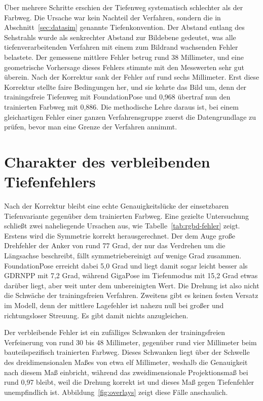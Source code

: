 \documentclass[oneside,studentpaper]{wbk}
\begin{document}
Über mehrere Schritte erschien der Tiefenweg systematisch schlechter als der
Farbweg. Die Ursache war kein Nachteil der Verfahren, sondern die in
Abschnitt~\ref{sec:datasim} genannte Tiefenkonvention. Der Abstand entlang des
Sehstrahls wurde als senkrechter Abstand zur Bildebene gedeutet, was alle
tiefenverarbeitenden Verfahren mit einem zum Bildrand wachsenden Fehler belastete.
Der gemessene mittlere Fehler betrug rund 38 Millimeter, und eine geometrische
Vorhersage dieses Fehlers stimmte mit den Messwerten sehr gut überein. Nach der
Korrektur sank der Fehler auf rund sechs Millimeter. Erst diese Korrektur stellte
faire Bedingungen her, und sie kehrte das Bild um, denn der trainingsfreie
Tiefenweg mit FoundationPose und 0,968 übertraf nun den trainierten Farbweg mit
0,886. Die methodische Lehre daraus ist, bei einem gleichartigen Fehler einer
ganzen Verfahrensgruppe zuerst die Datengrundlage zu prüfen, bevor man eine Grenze
der Verfahren annimmt.

\section{Charakter des verbleibenden Tiefenfehlers}
\label{sec:rgbd-charakter}

Nach der Korrektur bleibt eine echte Genauigkeitslücke der einsetzbaren
Tiefenvariante gegenüber dem trainierten Farbweg. Eine gezielte Untersuchung
schließt zwei naheliegende Ursachen aus, wie Tabelle~\ref{tab:rgbd-fehler} zeigt.
Erstens wird die Symmetrie korrekt herausgerechnet. Der dem Auge große Drehfehler
der Anker von rund 77 Grad, der nur das Verdrehen um die Längsachse beschreibt,
fällt symmetriebereinigt auf wenige Grad zusammen. FoundationPose erreicht dabei
5,0 Grad und liegt damit sogar leicht besser als GDRNPP mit 7,2 Grad, während
GigaPose im Tiefenmodus mit 15,2 Grad etwas darüber liegt, aber weit unter dem
unbereinigten Wert. Die Drehung ist also nicht die Schwäche der trainingsfreien
Verfahren. Zweitens gibt es keinen festen Versatz im Modell, denn der mittlere
Lagefehler ist nahezu null bei großer und richtungsloser Streuung. Es gibt damit
nichts anzugleichen.

Der verbleibende Fehler ist ein zufälliges Schwanken der trainingsfreien
Verfeinerung von rund 30 bis 48 Millimeter, gegenüber rund vier Millimeter beim
bauteilspezifisch trainierten Farbweg. Dieses Schwanken liegt über der Schwelle
des dreidimensionalen Maßes von etwa elf Millimeter, weshalb die Genauigkeit nach
diesem Maß einbricht, während das zweidimensionale Projektionsmaß bei rund 0,97
bleibt, weil die Drehung korrekt ist und dieses Maß gegen Tiefenfehler
unempfindlich ist. Abbildung~\ref{fig:overlays} zeigt diese Fälle anschaulich.
\end{document}
